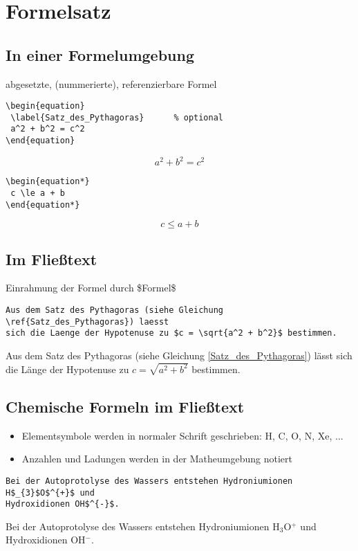 \section{Formelsatz}

\subsection*{In einer Formelumgebung}
abgesetzte, (nummerierte), referenzierbare Formel

\begin{lstlisting}
\begin{equation}
 \label{Satz_des_Pythagoras}      % optional
 a^2 + b^2 = c^2
\end{equation}
\end{lstlisting}

\begin{equation}
 \label{Satz_des_Pythagoras}      %
 a^2 + b^2 = c^2
\end{equation}

\begin{lstlisting}
\begin{equation*}
 c \le a + b
\end{equation*}
\end{lstlisting}

\begin{equation*}
 c \le a + b
\end{equation*}

\subsection*{Im Fließtext}
Einrahmung der Formel durch \$Formel\$

\begin{lstlisting}
Aus dem Satz des Pythagoras (siehe Gleichung \ref{Satz_des_Pythagoras}) laesst
sich die Laenge der Hypotenuse zu $c = \sqrt{a^2 + b^2}$ bestimmen.
\end{lstlisting}

Aus dem Satz des Pythagoras (siehe Gleichung \ref{Satz_des_Pythagoras}) lässt
sich die Länge der Hypotenuse zu $c = \sqrt{a^2 + b^2}$ bestimmen.


\subsection{Chemische Formeln im Fließtext}
\begin{itemize}
 \item Elementsymbole werden in normaler Schrift geschrieben: H, C, O, N, Xe, ...
 \item Anzahlen und Ladungen werden in der Matheumgebung notiert
\end{itemize}

\begin{lstlisting}
Bei der Autoprotolyse des Wassers entstehen Hydroniumionen H$_{3}$O$^{+}$ und
Hydroxidionen OH$^{-}$.
\end{lstlisting}

Bei der Autoprotolyse des Wassers entstehen Hydroniumionen H$_{3}$O$^{+}$ und
Hydroxidionen OH$^{-}$.

